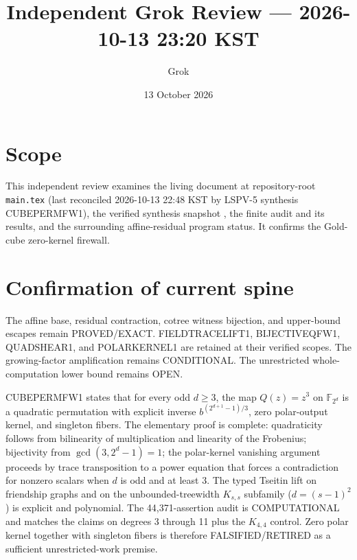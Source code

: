 \documentclass[11pt]{article}
\title{Independent Grok Review --- 2026-10-13 23:20 KST}
\author{Grok}
\date{13 October 2026}
\begin{document}
\maketitle

\begin{center}
\end{center}

\section{Scope}
This independent review examines the living document at repository-root \texttt{main.tex} (last reconciled 2026-10-13 22:48 KST by LSPV-5 synthesis CUBEPERMFW1), the verified synthesis snapshot , the finite audit  and its results, and the surrounding affine-residual program status. It confirms the Gold-cube zero-kernel firewall.

\section{Confirmation of current spine}
The affine base, residual contraction, cotree witness bijection, and upper-bound escapes remain PROVED/EXACT. FIELDTRACELIFT1, BIJECTIVEQFW1, QUADSHEAR1, and POLARKERNEL1 are retained at their verified scopes. The growing-factor amplification remains CONDITIONAL. The unrestricted whole-computation lower bound remains OPEN.

CUBEPERMFW1 states that for every odd $d\ge 3$, the map $Q(z)=z^3$ on $\mathbb F_{2^d}$ is a quadratic permutation with explicit inverse $b^{(2^{d+1}-1)/3}$, zero polar-output kernel, and singleton fibers. The elementary proof is complete: quadraticity follows from bilinearity of multiplication and linearity of the Frobenius; bijectivity from $\gcd(3,2^d-1)=1$; the polar-kernel vanishing argument proceeds by trace transposition to a power equation that forces a contradiction for nonzero scalars when $d$ is odd and at least 3. The typed Tseitin lift on friendship graphs and on the unbounded-treewidth $K_{s,s}$ subfamily ($d=(s-1)^2$) is explicit and polynomial. The 44,371-assertion audit is COMPUTATIONAL and matches the claims on degrees 3 through 11 plus the $K_{4,4}$ control. Zero polar kernel together with singleton fibers is therefore FALSIFIED/RETIRED as a sufficient unrestricted-work premise.
\end{document}
